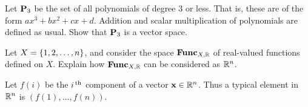 \begin{ex}
  Let $\mathbf{P}_{3}$ be the set of all polynomials of degree 3 or
  less. That is, these are of the form $ax^3+bx^2+cx+d$. Addition and
  scalar multiplication of polynomials are defined as usual.  Show
  that $\mathbf{P}_{3}$ is a vector space.
\end{ex}

\begin{ex}
  Let $X=\left\{1,2,\ldots,n\right\}$, and consider the space $\mathbf{Func}_{X,\mathbb{R}}$ of
  real-valued functions defined on $X$. Explain how $\mathbf{Func}_{X,\mathbb{R}}$ can be
  considered as $\mathbb{R}^{n}$.
  \begin{sol}
    Let $f(i)$ be the $i^{\,\rm th}$ component of a vector
    $\mbox{\bf x}\in\mathbb{R}^{n}$. Thus a typical element in $\mathbb{R}^{n}$ is
    $ (f(1),\ldots,f(n))$.
  \end{sol}
\end{ex}
